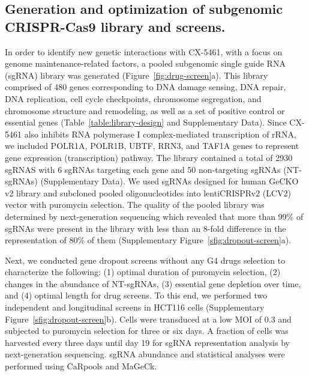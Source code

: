 
\subsection{Generation and optimization of subgenomic CRISPR-Cas9 library and screens.}
In order to identify new genetic interactions with CX-5461, with a focus on genome maintenance-related factors, a pooled subgenomic single guide RNA (sgRNA) library was generated (Figure~\ref{fig:drug-screen}a). 
This library comprised of 480 genes corresponding to DNA damage sensing, DNA repair, DNA replication, cell cycle checkpoints, chromosome segregation, and chromosome structure and remodeling, as well as a set of positive control or essential genes (Table~\ref{table:library-design} and Supplementary Data)\cite{Croft2014,Fabregat2016,Espeseth2011,Kanehisa2000}. 
Since CX-5461 also inhibits RNA polymerase I complex-mediated transcription of rRNA, we included POLR1A, POLR1B, UBTF, RRN3, and TAF1A genes to represent gene expression (transcription) pathway. 
The library contained a total of 2930 sgRNAS with 6 sgRNAs targeting each gene and 50 non-targeting sgRNAs (NT-sgRNAs)  (Supplementary Data). 
We used sgRNAs designed for human GeCKO v2 library and subcloned pooled oligonucleotides into lentiCRISPRv2 (LCV2) vector with puromycin selection\cite{Sanjana2014}. 
The quality of the pooled library was determined by next-generation sequencing which revealed that more than 99\% of sgRNAs were present in the library with less than an 8-fold difference in the representation of 80\% of them (Supplementary Figure~\ref{sfig:dropout-screen}a). 

Next, we conducted gene dropout screens without any G4 drugs selection to characterize the following: (1) optimal duration of puromycin selection, (2) changes in the abundance of NT-sgRNAs, (3) essential gene depletion over time, and (4) optimal length for drug screens. 
To this end, we performed two independent and longitudinal screens in HCT116 cells (Supplementary Figure~\ref{sfig:dropout-screen}b). 
Cells were transduced at a low MOI of 0.3 and subjected to puromycin selection for three or six days. 
A fraction of cells was harvested every three days until day 19 for sgRNA representation analysis by next-generation sequencing. 
sgRNA abundance and statistical analyses were performed using CaRpools and MaGeCk\cite{Winter2016,Li2014}.

